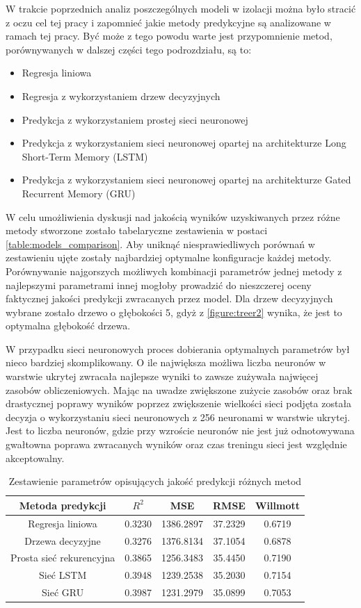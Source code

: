 \documentclass[10pt,a4paper]{article}
\begin{document}
W trakcie poprzednich analiz poszczególnych modeli w izolacji można było stracić z oczu cel tej pracy i zapomnieć jakie metody predykcyjne są analizowane w ramach tej pracy. Być może z tego powodu warte jest przypomnienie metod, porównywanych w dalszej części tego podrozdziału, są to:
\begin{itemize}
	\item Regresja liniowa
	\item Regresja z wykorzystaniem drzew decyzyjnych
	\item Predykcja z wykorzystaniem prostej sieci neuronowej
	\item Predykcja z wykorzystaniem sieci neuronowej opartej na architekturze Long Short-Term Memory (LSTM)
	\item Predykcja z wykorzystaniem sieci neuronowej opartej na architekturze Gated Recurrent Memory (GRU)
\end{itemize}

W celu umożliwienia dyskusji nad jakością wyników uzyskiwanych przez różne metody stworzone zostało tabelaryczne zestawienia w postaci \autoref{table:models_comparison}. Aby uniknąć niesprawiedliwych porównań w zestawieniu ujęte zostały najbardziej optymalne konfiguracje każdej metody. Porównywanie najgorszych możliwych kombinacji parametrów jednej metody z najlepszymi parametrami innej mogłoby prowadzić do nieszczerej oceny faktycznej jakości predykcji zwracanych przez model. Dla drzew decyzyjnych wybrane zostało drzewo o głębokości 5, gdyż z \autoref{figure:treer2} wynika, że jest to optymalna głębokość drzewa. 

W przypadku sieci neuronowych proces dobierania optymalnych parametrów był nieco bardziej skomplikowany. O ile największa możliwa liczba neuronów w warstwie ukrytej zwracała najlepsze wyniki to zawsze zużywała najwięcej zasobów obliczeniowych. Mając na uwadze zwiększone zużycie zasobów oraz brak drastycznej poprawy wyników poprzez zwiększenie wielkości sieci podjęta została decyzja o wykorzystaniu sieci neuronowych z 256 neuronami w warstwie ukrytej. Jest to liczba neuronów, gdzie przy wzroście neuronów nie jest już odnotowywana gwałtowna poprawa zwracanych wyników oraz czas treningu sieci jest względnie akceptowalny.


\begin{table}[h!]
	\centering
	\begin{tabular}{|c|c|c|c|c|}
		\hline
		Metoda predykcji & $R^2$ & MSE & RMSE & Willmott \\
		\hline
		Regresja liniowa & 0.3230 & 1386.2897 & 37.2329 & 0.6719 \\
		Drzewa decyzyjne & 0.3276 & 1376.8134 & 37.1054 & 0.6878\\
		Prosta sieć rekurencyjna & 0.3865  & 1256.3483 & 35.4450 & 0.7190 \\
		Sieć LSTM & 0.3948  & 1239.2538 & 35.2030 & 0.7154 \\
		Sieć GRU & 0.3987  & 1231.2979 & 35.0899 & 0.7053 \\
		\hline
	\end{tabular}
	\caption{Zestawienie parametrów opisujących jakość predykcji różnych metod}
	\label{table:models_comparison}
\end{table}
\end{document}
